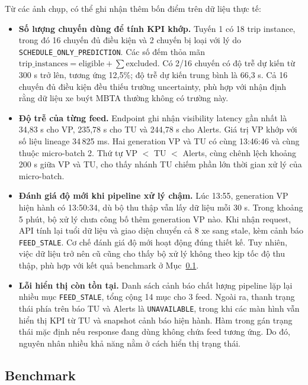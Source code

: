Từ các ảnh chụp, có thể ghi nhận thêm bốn điểm trên dữ liệu thực tế:
\begin{itemize}
    \item \textbf{Số lượng chuyến dùng để tính KPI khớp.} Tuyến 1 có 18 trip instance, trong đó 16 chuyến đủ điều kiện và 2 chuyến bị loại với lý do \texttt{SCHEDULE\_ONLY\_PREDICTION}. Các số đếm thỏa mãn $\text{trip\_instances} = \text{eligible} + \sum\text{excluded}$. Có 2/16 chuyến có độ trễ dự kiến từ 300 s trở lên, tương ứng 12,5\%; độ trễ dự kiến trung bình là 66,3 s. Cả 16 chuyến đủ điều kiện đều thiếu trường uncertainty, phù hợp với nhận định rằng dữ liệu xe buýt MBTA thường không có trường này.
    \item \textbf{Độ trễ của từng feed.} Endpoint  ghi nhận visibility latency gần nhất là 34,83 s cho VP, 235,78 s cho TU và 244,78 s cho Alerts. Giá trị VP khớp với số liệu lineage 34\,825 ms. Hai generation VP và TU có cùng  13:46:46 và cùng thuộc micro-batch 2. Thứ tự VP $<$ TU $<$ Alerts, cùng chênh lệch khoảng 200 s giữa VP và TU, cho thấy nhánh TU chiếm phần lớn thời gian xử lý của micro-batch.
    \item \textbf{Đánh giá độ mới khi pipeline xử lý chậm.} Lúc 13:55, generation VP hiện hành có  13:50:34, dù bộ thu thập vẫn lấy dữ liệu mỗi 30 s. Trong khoảng 5 phút, bộ xử lý chưa công bố thêm generation VP nào. Khi nhận request, API tính lại tuổi dữ liệu và giao diện chuyển cả 8 xe sang stale, kèm cảnh báo \texttt{FEED\_STALE}. Cơ chế đánh giá độ mới hoạt động đúng thiết kế. Tuy nhiên, việc dữ liệu trở nên cũ cũng cho thấy bộ xử lý không theo kịp tốc độ thu thập, phù hợp với kết quả benchmark ở Mục~\ref{sec:bench}.
    \item \textbf{Lỗi hiển thị còn tồn tại.} Danh sách cảnh báo chất lượng pipeline lặp lại nhiều mục \texttt{FEED\_STALE}, tổng cộng 14 mục cho 3 feed. Ngoài ra, thanh trạng thái phía trên báo TU và Alerts là \texttt{UNAVAILABLE}, trong khi các màn hình vẫn hiển thị KPI từ TU và snapshot cảnh báo hiện hành. Hàm  trong  gán trạng thái mặc định  nếu response đang dùng không chứa feed tương ứng. Do đó, nguyên nhân nhiều khả năng nằm ở cách hiển thị trạng thái.
\end{itemize}

\subsection{Benchmark}
\label{sec:bench}


